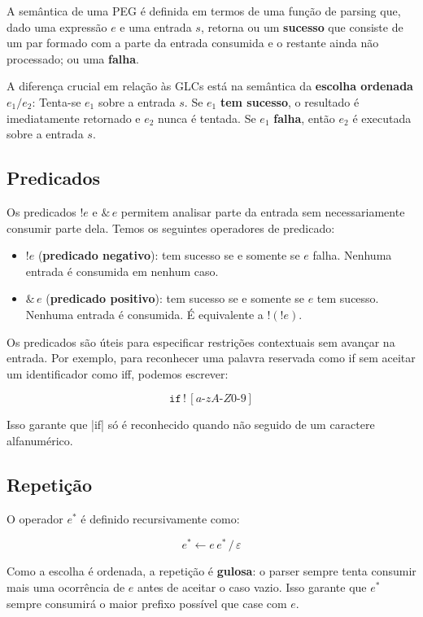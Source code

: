 A semântica de uma PEG é definida em termos de uma função de parsing
que, dado uma expressão \(e\) e uma entrada \(s\), retorna ou um
\textbf{sucesso} que consiste de um par formado com a parte da
entrada consumida e o restante ainda não processado; ou uma \textbf{falha}.

A diferença crucial em relação às GLCs está na semântica da
\textbf{escolha ordenada} \(e_1 / e_2\):
Tenta-se \(e_1\) sobre a entrada \(s\). Se \(e_1\) \textbf{tem
sucesso}, o resultado é imediatamente retornado e \(e_2\) nunca é
tentada. Se \(e_1\) \textbf{falha}, então \(e_2\) é executada sobre
a entrada \(s\).

\subsection{Predicados}

Os predicados \(!e\) e \(\&\,e\) permitem analisar parte da entrada
sem necessariamente consumir parte dela. Temos os seguintes
operadores de predicado:

\begin{itemize}
  \item
    \(!e\) (\textbf{predicado negativo}): tem sucesso se e somente se
    \(e\) falha. Nenhuma entrada é consumida em nenhum caso.
  \item
    \(\&\,e\) (\textbf{predicado positivo}): tem sucesso se e somente
    se \(e\) tem sucesso. Nenhuma entrada é consumida. É equivalente
    a \(!(!e)\).
\end{itemize}

Os predicados são úteis para especificar restrições contextuais sem
avançar na entrada. Por exemplo, para reconhecer uma palavra
reservada como if sem aceitar um
identificador como iff, podemos escrever:

\[
  \texttt{if}\, !\,[a\text{-}zA\text{-}Z0\text{-}9]
\]

Isso garante que \haskell|if| só é reconhecido quando
não seguido de um caractere alfanumérico.

\subsection{Repetição}

O operador \(e^*\) é definido recursivamente como:

\[
  e^* \leftarrow e\, e^* \,/\,\varepsilon
\]

Como a escolha é ordenada, a repetição é \textbf{gulosa}: o parser
sempre tenta consumir mais uma ocorrência de \(e\) antes de aceitar o
caso vazio. Isso garante que \(e^*\) sempre consumirá o maior prefixo
possível que case com \(e\).

